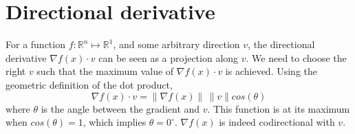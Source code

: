 \documentclass[9pt,twocolumn]{article}
\begin{document}
\section{Directional derivative}
For a function $f:\mathbb{R}^n \mapsto \mathbb{R}^1$, and some arbitrary direction $v$, the directional derivative $\nabla f(x) \cdot v$ can be seen as a projection along $v$. We need to choose the right $v$ such that the maximum value of $\nabla f(x) \cdot v$ is achieved. Using the geometric definition of the dot product,
\begin{equation*}
	\nabla f(x) \cdot v = \lVert \nabla f(x) \rVert \, \lVert v \rVert cos(\theta)
\end{equation*}
where $\theta$ is the angle between the gradient and $v$. This function is at its maximum when $cos(\theta)=1$, which implies $\theta=0^\circ$. $\nabla f(x)$ is indeed codirectional with $v$.
\end{document}
